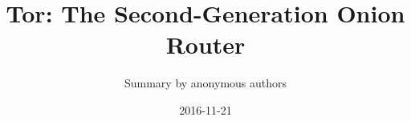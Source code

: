 \documentclass[11pt,twocolumn,a4paper,DIV=calc]{scrartcl}
\begin{document}
\title{Tor: The Second-Generation Onion Router}
\author{Summary by anonymous authors}
\date{2016-11-21}

\maketitle







 

\end{document}
